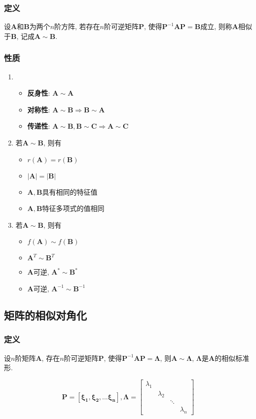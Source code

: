 \documentclass[oneside, onecolumn]{ctexbook}
\begin{document}
\subsubsection{定义}
设$ \bm{A} $和$ \bm{B} $为两个$ n $阶方阵, 若存在$ n $阶可逆矩阵$ \bm{P} $, 使得$ \bm{P}^{-1}\bm{A}\bm{P}=\bm{B} $成立, 则称$ \bm{A} $相似于$ \bm{B} $, 记成$ \bm{A}\sim \bm{B} $.
\subsubsection{性质}
\begin{enumerate}
	\item \begin{itemize}
		\item \textbf{反身性}: $ \bm{A}\sim \bm{A} $
		\item \textbf{对称性}: $ \bm{A}\sim \bm{B}\Rightarrow \bm{B}\sim \bm{A} $
		\item \textbf{传递性}: $ \bm{A}\sim \bm{B}, \bm{B}\sim \bm{C}\Rightarrow \bm{A}\sim \bm{C} $
	\end{itemize}
    \item 若$ \bm{A}\sim \bm{B} $, 则有\begin{itemize}
    	\item $ r(\bm{A})=r(\bm{B}) $
    	\item $ \left|\bm{A}\right|=\left|\bm{B}\right| $
    	\item $ \bm{A}, \bm{B} $具有相同的特征值
    	\item $ \bm{A}, \bm{B} $特征多项式的值相同
    \end{itemize}
    \item 若$ \bm{A}\sim \bm{B} $, 则有\begin{itemize}
    	\item $ f(\bm{A})\sim f(\bm{B}) $
    	\item $ \bm{A}^{T}\sim \bm{B}^{T} $
    	\item $ \bm{A} $可逆, $ \bm{A}^{*}\sim \bm{B}^{*} $
    	\item $ \bm{A} $可逆, $ \bm{A}^{-1}\sim \bm{B}^{-1} $
    \end{itemize}
\end{enumerate}
\subsection{矩阵的相似对角化}
\subsubsection{定义}
设$ n $阶矩阵$ \bm{A} $, 存在$ n $阶可逆矩阵$ \bm{P} $, 使得$ \bm{P}^{-1}\bm{A}\bm{P}=\bm{\Lambda} $, 则$ \bm{A}\sim \bm{\Lambda} $, $ \bm{\Lambda} $是$ \bm{A} $的相似标准形.\par 
\[ \bm{P}=\left[\bm{\xi_1}, \bm{\xi_2},... \bm{\xi_n}\right], \bm{\Lambda} =\begin{bmatrix}
	\lambda_1 &  &  &  \\
	& \lambda_2 &  &  \\
	&  & \ddots &  \\
	&  &  & \lambda_n 
\end{bmatrix}
 \]
\end{document}

